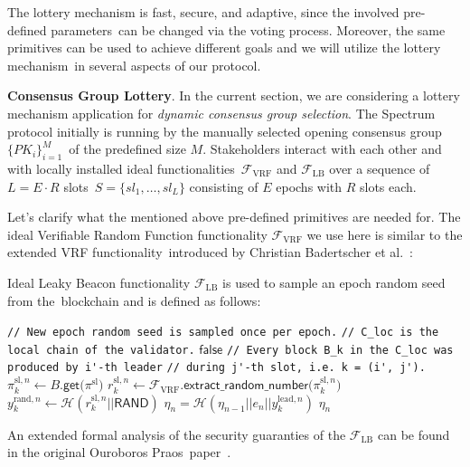 The lottery mechanism is fast, secure, and adaptive, since the involved pre-defined parameters\
can be changed via the voting process.
Moreover, the same primitives can be used to achieve different goals and we will utilize the lottery mechanism\
in several aspects of our protocol.

\textbf{Consensus Group Lottery}.
In the current section, we are considering a lottery mechanism application for \emph{dynamic consensus group selection}.
The Spectrum protocol initially is running by the manually selected opening consensus group $\{PK_i\}_{i=1}^M$\
of the predefined size $M$.
Stakeholders interact with each other and with locally installed ideal functionalities\
$\mathcal{F}_{\text{VRF}}$ and $\mathcal{F}_{\text{LB}}$ over a sequence of $L = E \cdot R$ slots\
${S=\{sl_1,\dots,sl_L\}}$ consisting of $E$ epochs with $R$ slots each.

Let's clarify what the mentioned above pre-defined primitives are needed for.
The ideal Verifiable Random Function functionality ${\mathcal{F}}_{\text{VRF}}$ we use here is similar to the extended VRF functionality\
introduced by Christian Badertscher et al.~\cite{cryptoeprint:2022/1045}:

Ideal Leaky Beacon functionality $\mathcal{F}_{\text{LB}}$ is used to sample an epoch random seed from the\
blockchain and is defined as follows:
\begin{functionality}
    \caption{${\mathcal{F}_{\text{LB}}(e_n, C_{\text{loc}})}$}
    \begin{algorithmic}
        \State \lstinline|// New epoch random seed is sampled once per epoch.|
        \State \lstinline|// C_loc is the local chain of the validator.|
        \If{${e_n \geq 2}$}
            \State \Return ${\textsf{false}}$
        \EndIf
            \State \lstinline|// Every block B_k in the C_loc was produced by i'-th leader|
            \State \lstinline|// during j'-th slot, i.e. k = (i', j').|
            \State ${\pi_k^{\text{sl}, n} \leftarrow B\textsf{.get(}\pi^{\text{sl}}\textsf{)}}$
            \State ${r_k^{\text{sl}, n} \leftarrow \mathcal{F}_{\text{VRF}}\textsf{.extract\_random\_number(}\pi_k^{\text{sl}, n}\textsf{)}}$
            \State $y_k^{\text{rand}, n} \leftarrow \mathcal{H}(r_k^{\text{sl}, n} || \textsf{RAND})$
            \State ${\eta_n = \mathcal{H}(\eta_{n - 1} || e_n || y_k^{\text{lead}, n})}$
        \EndFor
        \State \Return $\eta_n$
    \end{algorithmic}
\end{functionality}
An extended formal analysis of the security guaranties of the ${\mathcal{F}}_{\text{LB}}$ can be found in the original Ouroboros Praos\
paper~\cite{cryptoeprint:2017/573}.

